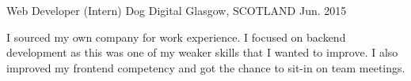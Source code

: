 \begin{cventries}
  \cventry
    {Web Developer (Intern)} %
    {Dog Digital} %
    {Glasgow, SCOTLAND} %
    {Jun. 2015} %
    {
      \begin{cvitems} %
        \item I sourced my own company for work experience. I focused on backend development as this was one of my weaker skills that I wanted to improve. I also improved my frontend competency and got the chance to sit-in on team meetings.
      \end{cvitems}
    }
\end{cventries}
\vspace{-0.3cm}
